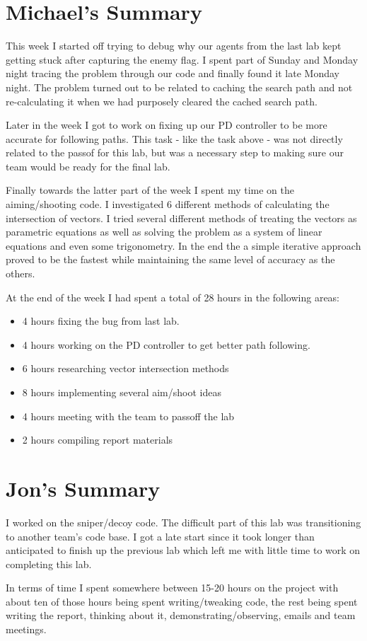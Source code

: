 \section{Michael's Summary}
This week I started off trying to debug why our agents from the last lab kept getting stuck after capturing the enemy flag. I spent part of Sunday and Monday night tracing the problem through our code
and finally found it late Monday night.  The problem turned out to be related to caching the search path
and not re-calculating it when we had purposely cleared the cached search path.
\par
Later in the week I got to work on fixing up our PD controller to be more accurate for following paths.  This task - like the task above - was not directly related to the passof for this lab, but was a necessary step to making sure our team would be ready for the final lab.
\par
Finally towards the latter part of the week I spent my time on the aiming/shooting code.  I investigated 6 different methods of calculating the intersection of vectors.  I tried several different methods of treating the vectors as parametric equations as well as solving the problem as a system of linear equations and even some trigonometry.  In the end the a simple iterative approach proved to be the fastest while maintaining the same level of accuracy as the others.
\par
At the end of the week I had spent a total of 28 hours in the following areas:
\begin{itemize}
    \item 4 hours fixing the bug from last lab.
    \item 4 hours working on the PD controller to get better path following.
    \item 6 hours researching vector intersection methods
    \item 8 hours implementing several aim/shoot ideas
    \item 4 hours meeting with the team to passoff the lab
    \item 2 hours compiling report materials
\end{itemize}

\section{Jon's Summary}

I worked on the sniper/decoy code.  The difficult part of this lab was transitioning to another team's code base.  I got a late start since it took  longer than anticipated to finish up the previous lab which left me with little time to work on completing this lab.

In terms of time I spent somewhere between 15-20 hours on the project with about ten of those hours being spent writing/tweaking code, the rest being spent writing the report, thinking about it, demonstrating/observing, emails and team meetings.

